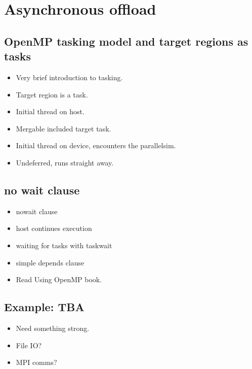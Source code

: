 

\chapter{Asynchronous offload}
\label{chapter:async}
\section{OpenMP tasking model and target regions as tasks}
\begin{itemize}
  \item Very brief introduction to tasking.
  \item Target region is a task.
  \item Initial thread on host.
  \item Mergable included target task.
  \item Initial thread on device, encounters the parallelsim.
  \item Undeferred, runs straight away.
\end{itemize}

\section{no wait clause}
\begin{itemize}
  \item nowait clause
  \item host continues execution
  \item waiting for tasks with taskwait
  \item simple depends clause
  \item Read Using OpenMP book.
\end{itemize}

\section{Example: TBA}
\begin{itemize}
  \item Need something strong.
  \item File IO?
  \item MPI comms?
\end{itemize}

